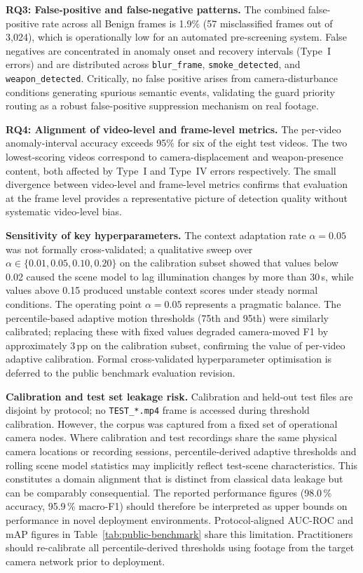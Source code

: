 \documentclass[a4paper,fleqn]{cas-dc}
\begin{document}
\textbf{RQ3: False-positive and false-negative patterns.} The combined false-positive rate across all Benign frames is 1.9\% (57 misclassified frames out of 3{,}024), which is operationally low for an automated pre-screening system. False negatives are concentrated in anomaly onset and recovery intervals (Type~I errors) and are distributed across \texttt{blur\_frame}, \texttt{smoke\_detected}, and \texttt{weapon\_detected}. Critically, no false positive arises from camera-disturbance conditions generating spurious semantic events, validating the guard priority routing as a robust false-positive suppression mechanism on real footage.
 
\textbf{RQ4: Alignment of video-level and frame-level metrics.} The per-video anomaly-interval accuracy exceeds 95\% for six of the eight test videos. The two lowest-scoring videos correspond to camera-displacement and weapon-presence content, both affected by Type~I and Type~IV errors respectively. The small divergence between video-level and frame-level metrics confirms that evaluation at the frame level provides a representative picture of detection quality without systematic video-level bias.
 
\textbf{Sensitivity of key hyperparameters.} The context adaptation rate $\alpha = 0.05$ was not formally cross-validated; a qualitative sweep over $\alpha \in \{0.01, 0.05, 0.10, 0.20\}$ on the calibration subset showed that values below 0.02 caused the scene model to lag illumination changes by more than 30\,s, while values above 0.15 produced unstable context scores under steady normal conditions. The operating point $\alpha = 0.05$ represents a pragmatic balance. The percentile-based adaptive motion thresholds (75th and 95th) were similarly calibrated; replacing these with fixed values degraded camera-moved F1 by approximately 3\,pp on the calibration subset, confirming the value of per-video adaptive calibration. Formal cross-validated hyperparameter optimisation is deferred to the public benchmark evaluation revision.
 
\textbf{Calibration and test set leakage risk.}
Calibration and held-out test files are disjoint by protocol; no \texttt{TEST\_*.mp4} frame is accessed during threshold calibration. However, the corpus was captured from a fixed set of operational camera nodes. Where calibration and test recordings share the same physical camera locations or recording sessions, percentile-derived adaptive thresholds and rolling scene model statistics may implicitly reflect test-scene characteristics. This constitutes a domain alignment that is distinct from classical data leakage but can be comparably consequential. The reported performance figures (98.0\,\% accuracy, 95.9\,\% macro-F1) should therefore be interpreted as upper bounds on performance in novel deployment environments. Protocol-aligned AUC-ROC and mAP figures in Table~\ref{tab:public-benchmark} share this limitation. Practitioners should re-calibrate all percentile-derived thresholds using footage from the target camera network prior to deployment.
 
\end{document}
